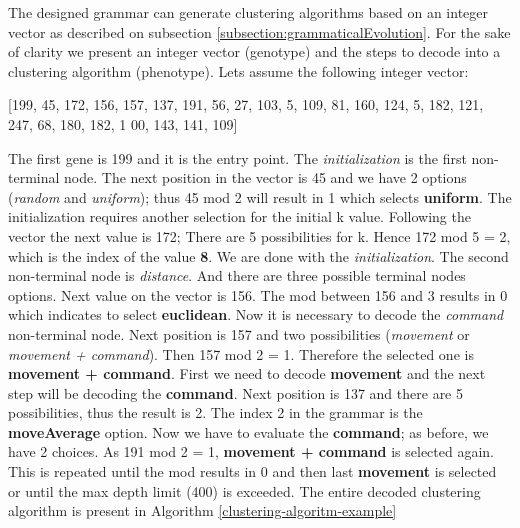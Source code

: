 \documentclass[journal]{IEEEtran}
\begin{document}
The designed grammar can generate clustering algorithms based on an integer vector as described on subsection \ref{subsection:grammaticalEvolution}. 
For the sake of clarity we present an integer vector (genotype) and the steps to decode into a clustering algorithm (phenotype). 
Lets assume the following integer vector:

[199, 45, 172, 156, 157, 137, 191, 56, 27, 103, 5, 109, 81, 160, 124, 5, 182, 121, 247, 68, 180, 182, 1
00, 143, 141, 109]

The first gene is 199 and it is the entry point. The \textit{initialization}  is the first non-terminal node. The next position in the vector is 45 
and we have 2 options  (\textit{random} and \textit{uniform}); thus 45 mod 2 will result in 1 which selects \textbf{uniform}. The initialization requires another selection for the initial k value. Following the vector the next value  is 172; There are 5 possibilities for k. Hence 172 mod 5 = 2, which is the index of the value \textbf{8}.
We are done with the \textit{initialization}. The second non-terminal node is \textit{distance}. And there are three possible terminal nodes options. Next value on the vector is 156. The mod between 
156 and 3 results in 0 which indicates to select \textbf{euclidean}. 
Now it is necessary to decode the \textit{command} non-terminal node. Next position is 157 and two possibilities (\textit{movement} or \textit{movement + command}). Then 157 mod 2 = 1. 
Therefore the selected one is \textbf{movement + command}. First we need to decode \textbf{movement} and the next step will be decoding the \textbf{command}. Next position is 137 and there are 5 possibilities, thus the result is 2. 
The index 2 in the grammar is the \textbf{moveAverage} option. Now we have to evaluate the \textbf{command}; as before, we have 2 choices. As 191 mod 2 = 1, \textbf{movement + command} is selected again. This is repeated until the mod results in 0 and then last \textbf{movement} is selected or until the max depth limit (400) is exceeded. The entire decoded clustering algorithm is present in Algorithm \ref{clustering-algoritm-example}
\end{document}
